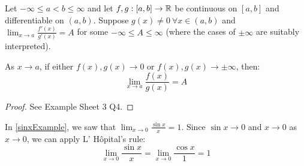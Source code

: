 \documentclass[../main.tex]{subfiles}
\begin{document}
\begin{proposition}
  Let $-\infty \leq a < b \leq \infty$ and let $f, g: [a, b] \to \mathbb{R}$ be continuous on $[a, b]$ and differentiable on $(a, b)$.
  Suppose $g(x) \neq 0\ \forall x \in (a, b)$ and $\lim_{x \to a} \frac{f'(x)}{g'(x)} = A$ for some $-\infty \leq A \leq \infty$ (where the cases of $\pm \infty$ are suitably interpreted). \label{lHopitals}

  As $x \to a$, if either $f(x), g(x) \to 0$ or $f(x), g(x) \to \pm \infty$, then:
  \[
    \lim_{x \to a} \frac{f(x)}{g(x)} = A
  \]
\end{proposition}
\begin{proof}
  See Example Sheet 3 Q4.
\end{proof}
\begin{example}
  In \cref{sinxExample}, we saw that $\lim_{x \to 0} \frac{\sin x}{x} = 1$.
  Since $\sin x \to 0$ and $x \to 0$ as $x \to 0$, we can apply L' H\^opital's rule:
  \[
    \lim_{x \to 0} \frac{\sin x}{x} = \lim_{x \to 0} \frac{\cos x}{1} = 1
  \]
\end{example}
\end{document}
